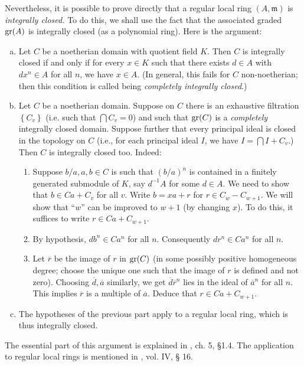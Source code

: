 \begin{exercise} 
Nevertheless, it is possible to prove directly that a regular local ring $(A,
\mathfrak{m})$ is
\emph{integrally closed.} 
To do this, we shall use the fact that the associated graded $\operatorname{gr}(A)$ is
integrally closed (as a polynomial ring). 
Here is the argument:
\begin{enumerate}[a)]
\item  Let $C$ be a noetherian domain with quotient field $K$. Then $C$ is integrally closed if and
only if for every $x \in K$ such that there exists $d \in A$ with $dx^n \in A$
for all $n$, we have $x \in A$. (In general, this fails for $C$ non-noetherian;
then this condition is called being \emph{completely integrally closed}.)
\item Let $C$ be a noetherian domain. Suppose on $C$ there is an exhaustive
filtration $\left\{C_v\right\}$ (i.e. such that $\bigcap C_v = 0$) and such
that $\operatorname{gr}(C)$ is a \emph{completely} integrally closed domain. Suppose further that
every principal ideal is closed in the topology on $C$ (i.e., for each
principal ideal $I$, we have $I = \bigcap I + C_v$.) Then $C$ is integrally
closed too. Indeed:
\begin{enumerate}
\item  Suppose $b/a, a, b \in C$ is such that $(b/a)^n$ is contained in a finitely
generated submodule of $K$, say $d^{-1}A$ for some $d \in A$. We need to show
that $b \in Ca + C_v$ for all $v$. Write $b  = xa + r$ for $r \in C_{w} -
C_{w+1}$. We
will show that ``$w$'' can be improved to $w+1$ (by changing $x$).
To do this, it suffices to write $r \in Ca + C_{w+1}$.
\item  By hypothesis, $db^n \in Ca^n$ for all $n$. Consequently $dr^n \in Ca^n$
for all $n$.
\item Let $\overline{r}$ be the image of $r$ in $\operatorname{gr}(C)$ (in some possibly
positive homogeneous degree; choose the unique one such that the image of $r$
is defined and not zero). Choosing $\overline{d}, \overline{a}$ similarly, we
get $\overline{d} \overline{r}^n$ lies in the ideal of $\overline{a}^n$ for all
$n$. This implies $\overline{r}$ is a multiple of $\overline{a}$. Deduce that
$r \in Ca + C_{w+1}$.
\end{enumerate}
\item The hypotheses of the previous part apply to a regular local ring, which
is thus integrally closed.
\end{enumerate}
The essential part of this argument is explained in \cite{Bo68}, ch. 5, \S 1.4.
The application to regular local rings is mentioned in \cite{EGA}, vol. IV, \S
16.
\end{exercise} 


